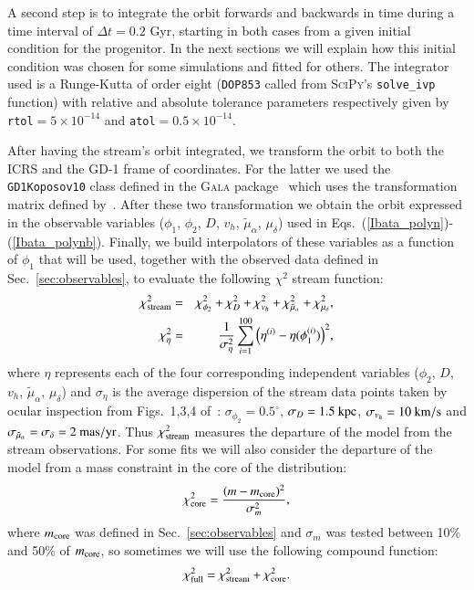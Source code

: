 \documentclass[twocolumn]{aa}
\begin{document}
A second step is to integrate the orbit forwards and backwards in time during a time interval of $\Delta t=0.2$ Gyr, starting in both cases from a given initial condition for the progenitor. In the next sections
we will explain how this initial condition was chosen for some simulations and fitted for others. The integrator used is a Runge-Kutta of order eight (\texttt{DOP853} called from {\scshape{SciPy}}'s \texttt{solve\_ivp} function) with relative and absolute tolerance parameters respectively given by
\texttt{rtol}$=5\times10^{-14}$ and \texttt{atol}$=0.5\times10^{-14}$.

After having the stream's orbit integrated, we transform the orbit to both the ICRS and the GD-1 frame of coordinates. For the latter we used the \texttt{GD1Koposov10} class defined in the {\scshape{Gala}} package~\citep{gala,adrian_price_whelan_2020_4159870} which uses the transformation matrix defined
by~\citet{Koposov_2010}.
After these two transformation we obtain the orbit expressed in the observable variables ($\phi_1$, $\phi_2$, $D$, $v_h$, $\tilde{\mu}_\alpha$, $\mu_\delta$) used in Eqs.~(\ref{Ibata_polyn})-(\ref{Ibata_polynb}).
Finally, we build interpolators of these variables as a function of $\phi_1$ that will be used, together with the observed data defined in Sec.~\ref{sec:observables}, to evaluate the following $\chi^2$ stream function:
\begin{eqnarray}
   \label{chi2}
   \chi^2_{\rm{stream}} &=& \chi^2_{\phi_2} + \chi^2_{D}+ \chi^2_{v_h}+\chi^2_{\tilde{\mu}_\alpha}+ \chi^2_{\mu_\delta},\\
   \chi^2_{\eta} &=& \frac{1}{\sigma_\eta^2}\sum_{i=1}^{100} \Big(\eta^{(i)}-\eta(\phi_1^{(i)})\Big)^2,
\end{eqnarray}
where
$\eta$ represents each of the four corresponding independent variables ($\phi_2$, $D$, $v_h$, $\tilde{\mu}_\alpha$, $\mu_\delta$) and $\sigma_\eta$ is the average dispersion of the stream data points taken by
ocular inspection from Figs.~1,3,4 of~\citet{Ibata_2020}:
$\sigma_{\phi_2}=0.5^\circ$,
$\sigma_{D}= 1.5~\rm{kpc}$,
$\sigma_{v_h} = 10~\rm{km/s}$ and
$\sigma_{\tilde{\mu}_\alpha}= \sigma_{\delta}= 2~\rm{mas/yr}$.
Thus $\chi^2_{\rm{stream}}$ measures the departure of the model from the stream observations.
For some fits we will also consider the departure of the model from a mass constraint in the core
of the distribution:
\begin{equation}
   \chi^2_{\rm{core}}=\frac{(m-m_{\rm{core}})^2}{\sigma_m^2},
\end{equation}
where $m_{\rm{core}}$ was defined in Sec.~\ref{sec:observables} and
$\sigma_m$ was tested between 10\% and 50\% of $m_{\rm{core}}$, so sometimes we will use the following compound function:
\begin{equation}
   \label{chi2_full}
   \chi^2_{\rm{full}}=\chi^2_{\rm{stream}}+\chi^2_{\rm{core}}.
\end{equation}
\end{document}
